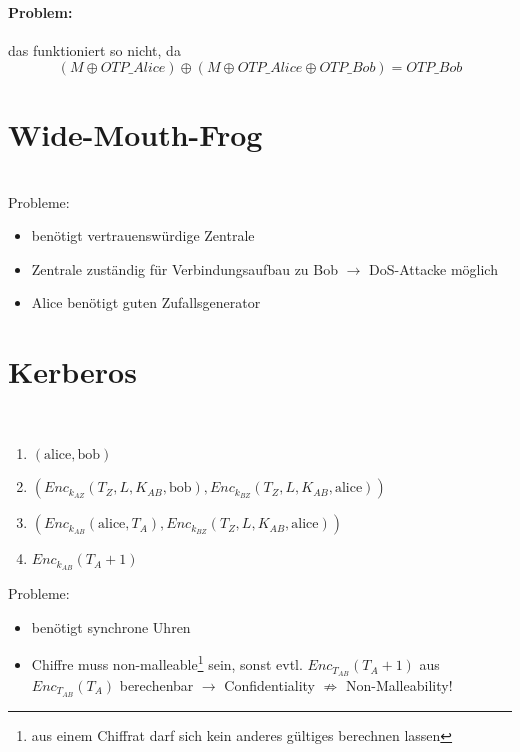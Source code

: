 \documentclass[a4paper,twoside,DIV15,BCOR12mm]{scrbook}
\begin{document}
\\

\paragraph{Problem:} das funktioniert so nicht, da $$(M \oplus OTP\_Alice) \oplus (M \oplus OTP\_Alice \oplus OTP\_Bob) = OTP\_Bob$$

\section{Wide-Mouth-Frog}

\\

Probleme:

\begin{itemize}
	\item benötigt vertrauenswürdige Zentrale
	\item Zentrale zuständig für Verbindungsaufbau zu Bob $\rightarrow$ DoS-Attacke möglich
	\item Alice benötigt guten Zufallsgenerator
\end{itemize}

\section{Kerberos}

\\

\begin{enumerate}
	\item $(\text{alice}, \text{bob})$
	\item $({Enc}_{k_{AZ}}(T_Z, L, K_{AB}, \text{bob}), {Enc}_{k_{BZ}}(T_Z, L, K_{AB}, \text{alice}))$
	\item $({Enc}_{k_{AB}}(\text{alice}, T_A), {Enc}_{k_{BZ}}(T_Z, L, K_{AB}, \text{alice}))$
	\item ${Enc}_{k_{AB}}(T_A + 1)$
\end{enumerate}

Probleme:

\begin{itemize}
	\item benötigt synchrone Uhren
	\item Chiffre muss non-malleable\footnote{aus einem Chiffrat darf sich kein anderes gültiges berechnen lassen} sein, sonst evtl. $Enc_{T_{AB}}(T_A + 1)$ aus $Enc_{T_{AB}}(T_A)$ berechenbar $\rightarrow$ Confidentiality $\nRightarrow$ Non-Malleability!
\end{itemize}
\end{document}
